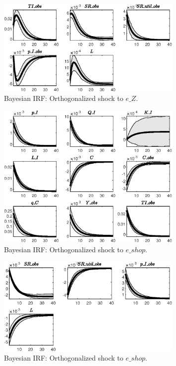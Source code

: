 \begin{figure}[H]
\centering 
\includegraphics[width=0.80\textwidth]{directed_search/Output/directed_search_Bayesian_IRF_e_Z_2}
\caption{Bayesian IRF: Orthogonalized shock to $e\_Z$.}
\label{Fig:BayesianIRF:e_Z:2}
\end{figure}
 
\begin{figure}[H]
\centering 
\includegraphics[width=0.80\textwidth]{directed_search/Output/directed_search_Bayesian_IRF_e_shop_1}
\caption{Bayesian IRF: Orthogonalized shock to $e\_shop$.}
\label{Fig:BayesianIRF:e_shop:1}
\end{figure}
 
\begin{figure}[H]
\centering 
\includegraphics[width=0.80\textwidth]{directed_search/Output/directed_search_Bayesian_IRF_e_shop_2}
\caption{Bayesian IRF: Orthogonalized shock to $e\_shop$.}
\label{Fig:BayesianIRF:e_shop:2}
\end{figure}
 

